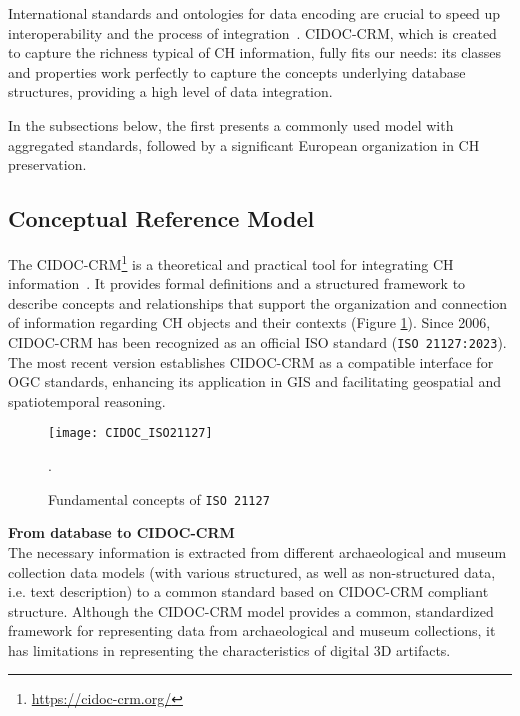International standards and ontologies for data encoding are crucial
to speed up interoperability and the process of integration~\cite{eide2008encoding}. \gls{CIDOC-CRM}, which is created to capture the richness typical of CH
information, fully fits our needs: its classes and properties
work perfectly to capture the concepts underlying database structures, providing a high level of data integration.

In the subsections below, the first presents a commonly used model with aggregated standards, followed by a significant European organization in \gls{CH} preservation.

\subsection{ Conceptual Reference Model} 
\label{sec:cidoc}


The \gls{CIDOC-CRM}\footnote{\url{https://cidoc-crm.org/}} is a theoretical and practical tool for integrating \gls{CH} information~\cite{eide2008encoding}. It provides formal definitions and a structured framework to describe concepts and relationships that support the organization and connection of information regarding \gls{CH} objects and their contexts (Figure \ref{fig:cidoc}).
Since 2006, \gls{CIDOC-CRM} has been recognized as an official ISO standard (\texttt{ISO 21127:2023}). The most recent version establishes \gls{CIDOC-CRM} as a compatible interface for \gls{OGC} standards, enhancing its application in \gls{GIS} and facilitating geospatial and spatiotemporal reasoning.


\begin{figure}[h!]
    \centering
    \texttt{[image: CIDOC\_ISO21127]}
    \caption{Fundamental concepts of \texttt{ISO 21127}~\cite{doerr2007cidoc}}.
    \label{fig:cidoc}
\end{figure}
\FloatBarrier

\newpage

\noindent \textbf{From database to \gls{CIDOC-CRM}} \\
The necessary information is extracted from different archaeological and museum collection data models (with various structured, as well as non-structured
data, i.e. text description) to a common standard based on \gls{CIDOC-CRM} compliant structure.
Although the \gls{CIDOC-CRM} model provides a common, standardized framework for representing data from archaeological and museum collections, it has limitations in representing the characteristics of digital \gls{3D} artifacts.




